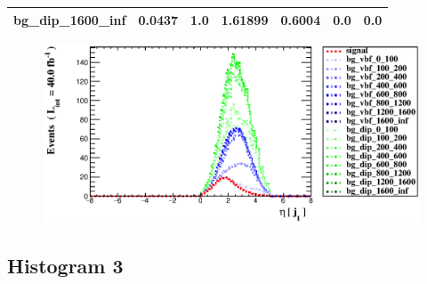 \documentclass[a4paper, 10pt]{article}
\begin{document}
\begin{table}[H]
\begin{center}
\begin{tabular}{|m{23.0mm}|m{23.0mm}|m{18.0mm}|m{19.0mm}|m{19.0mm}|m{19.0mm}|m{19.0mm}|}
      \hline
      {\cellcolor{white}         bg\_dip\_1600\_inf}& {\cellcolor{white}         0.0437}& {\cellcolor{white}         1.0}& {\cellcolor{white}         1.61899}& {\cellcolor{white}         0.6004}& {\cellcolor{green}         0.0}& {\cellcolor{green}         0.0}\\
\hline
    \end{tabular}
  \end{center}
\end{table}

\begin{figure}[H]
  \begin{center}
    \includegraphics[scale=0.45]{selection_1.eps}\\
\caption{   }
  \end{center}
\end{figure}
      \newpage
\subsection{ Histogram 3}
\end{document}
